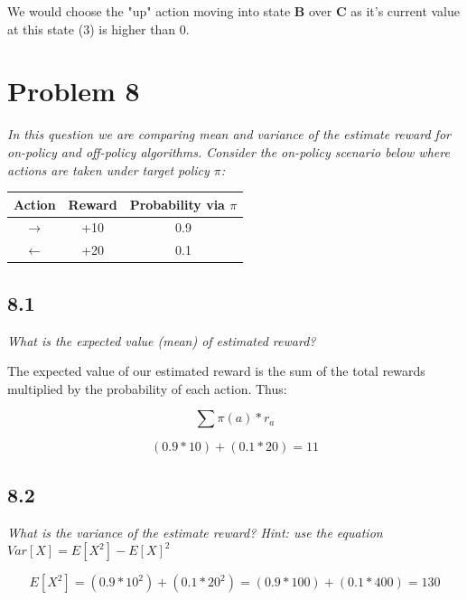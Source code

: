 \documentclass{article}
\begin{document}
We would choose the "up" action moving into state \textbf{B} over \textbf{C} as it's current value at this state (3) is higher than 0.



\section*{Problem 8}
\textit{In this question we are comparing mean and variance of the estimate reward for on-policy and off-policy algorithms. Consider the on-policy scenario below where actions are taken under target policy $\pi$:}

\begin{center}
    \begin{tabular}{ |c|c|c| }
        \hline
        Action        & Reward & Probability via $\pi$ \\
        \hline
        $\rightarrow$ & +10    & 0.9                   \\
        \hline
        $\leftarrow$  & +20    & 0.1                   \\
        \hline
    \end{tabular}
\end{center}

\subsection*{8.1}

\textit{What is the expected value (mean) of estimated reward?}

The expected value of our estimated reward is the sum of the total rewards multiplied by the probability of each action. Thus:

\begin{equation}
    \sum \pi(a) * r_a
\end{equation}

\begin{equation}
    (0.9 * 10) + (0.1* 20) = 11
\end{equation}

\subsection*{8.2}

\textit{What is the variance of the estimate reward? Hint: use the equation $Var[X] = E[X^2] - E[X]^2$}

\begin{equation}
    E[X^2] = (0.9 * 10^2) + (0.1*20^2) = (0.9*100) + (0.1*400) = 130
\end{equation}
\end{document}

